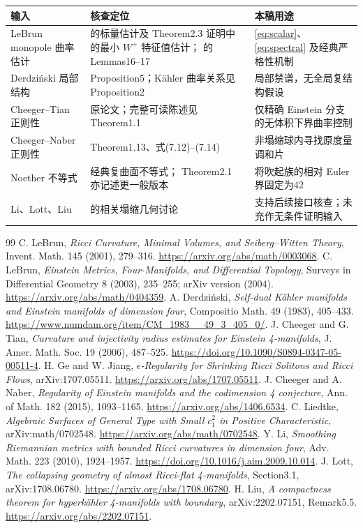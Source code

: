 \documentclass[UTF8,fontset=fandol,zihao=-4]{ctexart}
\theoremstyle{cn}
\numberwithin{equation}{section}
\begin{document}
\begin{longtable}{@{}>{\raggedright\arraybackslash}p{}>{\raggedright\arraybackslash}p{}>{\raggedright\arraybackslash}p{}@{}}
\toprule
输入 & 核查定位 & 本稿用途\\\midrule\endhead
LeBrun monopole 曲率估计 & \cite{lebrun2001} 的标量估计及 Theorem2.3 证明中的最小 $W^+$ 特征值估计；\cite{lebrun2004} 的 Lemmas16--17 & \eqref{eq:scalar}、\eqref{eq:spectral} 及经典严格性机制\\
Derdziński 局部结构 & \cite{derd} Proposition5；Kähler 曲率关系见 Proposition2 & 局部禁谱，无全局复结构假设\\
Cheeger--Tian 正则性 & 原论文\cite{ct}；完整可读陈述见\cite{gejiang} Theorem1.1 & 仅精确 Einstein 分支的无体积下界曲率控制\\
Cheeger--Naber 正则性 & \cite{cn} Theorem1.13、式(7.12)--(7.14) & 非塌缩球内寻找原度量调和片\\
Noether 不等式 & 经典复曲面不等式；\cite{liedtke} Theorem2.1 亦记述更一般版本 & 将吹起族的相对 Euler 界固定为42\\
Li、Lott、Liu & \cite{li,lott,liu} 的相关塌缩几何讨论 & 支持后续接口核查；未充作无条件证明输入\\
\bottomrule
\end{longtable}

\begin{thebibliography}{99}
C. LeBrun, \emph{Ricci Curvature, Minimal Volumes, and Seiberg--Witten Theory}, Invent. Math. 145 (2001), 279--316.
\url{https://arxiv.org/abs/math/0003068}.
C. LeBrun, \emph{Einstein Metrics, Four-Manifolds, and Differential Topology}, Surveys in Differential Geometry 8 (2003), 235--255; arXiv version (2004).
\url{https://arxiv.org/abs/math/0404359}.
A. Derdziński, \emph{Self-dual Kähler manifolds and Einstein manifolds of dimension four}, Compositio Math. 49 (1983), 405--433.
\url{https://www.numdam.org/item/CM_1983__49_3_405_0/}.
J. Cheeger and G. Tian, \emph{Curvature and injectivity radius estimates for Einstein 4-manifolds}, J. Amer. Math. Soc. 19 (2006), 487--525.
\url{https://doi.org/10.1090/S0894-0347-05-00511-4}.
H. Ge and W. Jiang, \emph{$\epsilon$-Regularity for Shrinking Ricci Solitons and Ricci Flows}, arXiv:1707.05511.
\url{https://arxiv.org/abs/1707.05511}.
J. Cheeger and A. Naber, \emph{Regularity of Einstein manifolds and the codimension 4 conjecture}, Ann. of Math. 182 (2015), 1093--1165.
\url{https://arxiv.org/abs/1406.6534}.
C. Liedtke, \emph{Algebraic Surfaces of General Type with Small $c_1^2$ in Positive Characteristic}, arXiv:math/0702548.
\url{https://arxiv.org/abs/math/0702548}.
Y. Li, \emph{Smoothing Riemannian metrics with bounded Ricci curvatures in dimension four}, Adv. Math. 223 (2010), 1924--1957.
\url{https://doi.org/10.1016/j.aim.2009.10.014}.
J. Lott, \emph{The collapsing geometry of almost Ricci-flat 4-manifolds}, Section3.1, arXiv:1708.06780.
\url{https://arxiv.org/abs/1708.06780}.
H. Liu, \emph{A compactness theorem for hyperkähler 4-manifolds with boundary}, arXiv:2202.07151, Remark5.5.
\url{https://arxiv.org/abs/2202.07151}.
\end{thebibliography}
\end{document}
